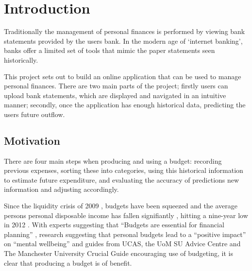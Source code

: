 \chapter{Introduction}
\label{cha:introduction}

\begin{comment}
This chapter puts the work into context. Having read it, the reader should be left in no doubt as to:

- the topic area to which the work applies
- why the work is being done
- what else has been done in the area and by whom
 - how the author proposes to tackle the problem: The project proposal is often expressed in terms of a main objective and possibly one or more additional objectives. It is useful to define "milestones" or "sub-goals" that mark the progress towards the objectives. 
 - It is common to end this chapter with a brief overview of each of the subsequent chapters of the report.
\end{comment}

Traditionally the management of personal finances is performed by viewing bank statements provided by the users bank. In the modern age of `internet banking', banks offer a limited set of tools that mimic the paper statements seen historically.

This project sets out to build an online application that can be used to manage personal finances. There are two main parts of the project; firstly users can upload bank statements, which are displayed and navigated in an intuitive manner; secondly, once the application has enough historical data, predicting the users future outflow.

\section{Motivation}
There are four main steps when producing and using a budget: recording previous expenses, sorting these into categories, using this historical information to estimate future expenditure, and evaluating the accuracy of predictions new information and adjusting accordingly.

Since the liquidity crisis of 2009 \parencite{gore2010}, budgets have been squeezed and the average persons personal disposable income has fallen signifiantly , hitting a nine-year low in 2012 \parencite{barnard2012households}. With experts suggesting that ``Budgets are essential for financial planning'' \parencite{wsj2013budget}, research suggesting that personal budgets lead to a ``positive impact'' on ``mental wellbeing'' \parencite{tlap2013budget} and guides from UCAS, the UoM SU Advice Centre and The Manchester University Crucial Guide encouraging use of budgeting, it is clear that producing a budget is of benefit. 

